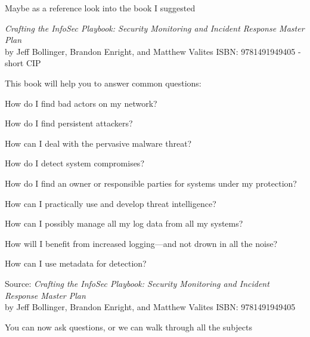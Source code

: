 \documentclass[Screen16to9,17pt]{foils}
\begin{document}
\begin{quote}

\end{quote}

\begin{list2}
    \item
\end{list2}



Maybe as a reference look into the book I suggested


\emph{Crafting the InfoSec Playbook: Security Monitoring and Incident Response Master Plan}\\
 by Jeff Bollinger, Brandon Enright, and Matthew Valites ISBN: 9781491949405 - short CIP




This book will help you to answer common questions:
\begin{list2}
\item How do I find bad actors on my network?
\item How do I find persistent attackers?
\item How can I deal with the pervasive malware threat?
\item How do I detect system compromises?
\item How do I find an owner or responsible parties for systems under my protection?
\item How can I practically use and develop threat intelligence?
\item How can I possibly manage all my log data from all my systems?
\item How will I benefit from increased logging—and not drown in all the noise?
\item How can I use metadata for detection?
\end{list2}
Source: \emph{Crafting the InfoSec Playbook: Security Monitoring and Incident Response Master Plan}\\
 by Jeff Bollinger, Brandon Enright, and Matthew Valites ISBN: 9781491949405




You can now ask questions, or we can walk through all the subjects
\end{document}
